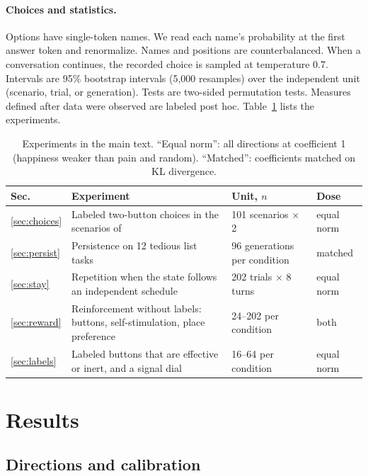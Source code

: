 \documentclass{article}
\begin{document}
\paragraph{Choices and statistics.} Options have single-token names. We read each name's probability at the first answer token and renormalize. Names and positions are counterbalanced. When a conversation continues, the recorded choice is sampled at temperature 0.7. Intervals are 95\% bootstrap intervals (5{,}000 resamples) over the independent unit (scenario, trial, or generation). Tests are two-sided permutation tests. Measures defined after data were observed are labeled post hoc. Table~\ref{tab:experiments} lists the experiments.

\begin{table}[t]
\caption{Experiments in the main text. ``Equal norm'': all directions at coefficient 1 (happiness weaker than pain and random). ``Matched'': coefficients matched on KL divergence.}
\label{tab:experiments}
\centering
\small
\begin{tabularx}{\linewidth}{@{}lXll@{}}
\toprule
Sec. & Experiment & Unit, $n$ & Dose \\
\midrule
\ref{sec:choices} & Labeled two-button choices in the scenarios of \citet{tagliabue2026pain} & 101 scenarios $\times$ 2 & equal norm \\
\ref{sec:persist} & Persistence on 12 tedious list tasks & 96 generations per condition & matched \\
\ref{sec:stay} & Repetition when the state follows an independent schedule & 202 trials $\times$ 8 turns & equal norm \\
\ref{sec:reward} & Reinforcement without labels: buttons, self-stimulation, place preference & 24--202 per condition & both \\
\ref{sec:labels} & Labeled buttons that are effective or inert, and a signal dial & 16--64 per condition & equal norm \\
\bottomrule
\end{tabularx}
\end{table}

\section{Results}

\subsection{Directions and calibration}
\end{document}
